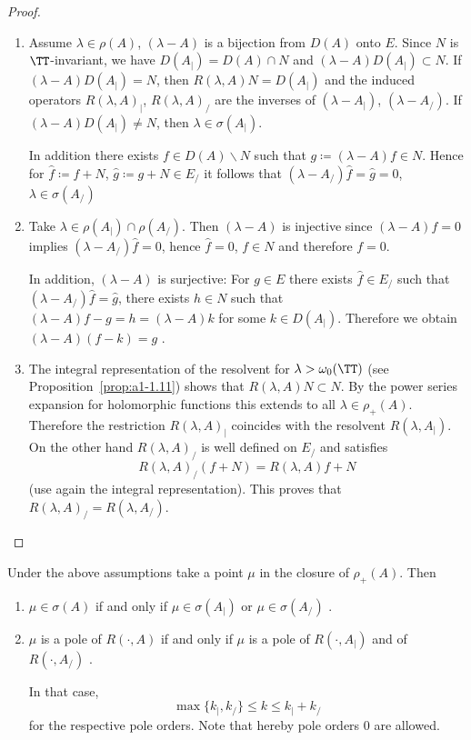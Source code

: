 \begin{proof}
\begin{enumerate}[\upshape (i), wide, labelindent=.25em]
\item 
Assume $\lambda \in \rho(A)$, \ie $(\lambda-A)$ is a bijection from $D(A)$ onto $E$.
Since $N$ is $\TT$-invariant, we have $D(A_{|}) = D(A) \cap N$ and $(\lambda-A)D(A_{|}) \subset N$.
If\/ $(\lambda-A)D(A_{|}) = N$, then $R(\lambda,A)N = D(A_{|})$ and the induced operators $R(\lambda,A)_{|}$, \resp $R(\lambda,A)_{/}$ are the inverses of\/ $(\lambda-A_{|})$, \resp $(\lambda-A_{/})$.
If\/ $(\lambda-A)D(A_{|}) \neq N$, then $\lambda \in \sigma(A_{|})$.

In addition there exists $f \in D(A)\backslash N$ such that $g \coloneqq (\lambda-A)f \in N$.
Hence for $\hat{f} \coloneqq f+N$, $\hat{g} \coloneqq g+N \in E_{/}$ it follows that $(\lambda-A_{/})\hat{f} = \hat{g} = 0$, \ie $\lambda \in \sigma(A_{/})$

\item 
Take $\lambda \in \rho(A_{|}) \cap \rho(A_{/})$.
Then $(\lambda-A)$ is injective since $(\lambda-A)f = 0$ implies $(\lambda-A_{/})\hat{f}= 0$, hence $\hat{f} = 0$, \ie $f \in N$ and therefore $f = 0$.

In addition, $(\lambda-A)$ is surjective: For $g \in E$ there exists $\hat{f} \in E_{/}$ such that $(\lambda-A_{/})\hat{f} = \hat{g}$, \ie there exists $h \in N$ such that $(\lambda-A)f - g = h = (\lambda-A)k$ for some $k \in D(A_{|})$.
Therefore we obtain $(\lambda-A)(f-k) = g$ .

\item 
The integral representation of the resolvent for $\lambda > \omega_{0}(\TT)$ (see Proposition~\ref{prop:a1-1.11}) shows that $R(\lambda,A)N \subset N$.
By the power series expansion for holomorphic functions this extends to all $\lambda \in \rho_{+}(A)$.
Therefore the restriction $R(\lambda,A)_{|}$ coincides with the resolvent $R(\lambda,A_{|})$.
On the other hand $R(\lambda,A)_{/}$ is well defined on $E_{/}$ and satisfies
\[
R(\lambda,A)_{/}(f+N) = R(\lambda,A)f + N
\]
(use again the integral representation).
This proves that $R(\lambda,A)_{/} = R(\lambda,A_{/})$.
\end{enumerate}
\end{proof}
\begin{corollary}\label{cor:a3-4.3}
Under the above assumptions take a point $\mu$ in the closure of\/ $\rho_{+}(A)$.
Then
\begin{enumerate}[\upshape (i)]
\item 
$\mu \in \sigma(A)$ if and only if\/ $\mu \in \sigma(A_{|})$ or $\mu \in \sigma(A_{/})$ .

\item 
$\mu$ is a pole of\/ $R(\cdot,A)$ if and only if\/ $\mu$ is a pole of\/ $R(\cdot,A_{|})$ and of\/ $R(\cdot,A_{/})$ .

In that case,
\[
\max\{k_{|},k_{/}\} \leq k \leq k_{|} + k_{/}
\]
for the respective pole orders. Note that hereby pole orders $0$ are allowed.
\end{enumerate}
\end{corollary}

